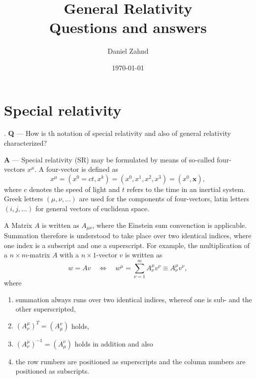 \documentclass[a4paper,11pt]{article}
\title{General Relativity\\ \vspace{0.2cm}\normalsize Questions and answers}
\author{Daniel Zahnd}
\date{\today}
\newcounter{question}
\numberwithin{equation}{section}
\newcommand\vect[1]{\ensuremath{\bm{#1}}}
\begin{document}
\newcommand\Que[1]{%
   \leavevmode\par
   \stepcounter{question}
   \noindent
   \thequestion. \textbf{Q} --- #1\par}

\newcommand\Ans[2][]{%
    \leavevmode\par\noindent
   {\leftskip0pt
    \textbf{A} --- \textbf{#1}#2\par}}

\maketitle
\thispagestyle{empty}
\tableofcontents

\newpage

\setcounter{page}{1}

\section{Special relativity}
\Que{How is th notation of special relativity and also of general relativity characterized?}
\Ans{
Special relativity (SR) may be formulated by means of so-called four-vectors $x^\mu$.
A four-vector is defined as \begin{equation}\label{defvierervektor}
x^\mu = (x^0 = ct,x^k) = (x^0,x^1,x^2,x^3) = (x^0, \vect{x}),
\end{equation} where $c$ denotes the speed of light and $t$ refers to the time in an inertial system. Greek letters $(\mu, \nu, \dots)$ are used for the components of four-vectors, latin letters $(i,j,\dots)$ for general vectors of euclidean space.

A Matrix $A$ is written as $A_{\mu\nu}$, where the Einstein sum convenction is applicable. Summation therefore is understood to take place over two identical indices, where one index is a subscript and one a superscript. For example, the multiplication of a $n\times m$-matrix $A$ with a $n\times 1$-vector $v$ is written as \begin{equation}
w = Av \quad \Leftrightarrow \quad w^\mu =\sum_{\nu = 1}^{m}A^\mu_{\nu} v^\nu \equiv A^\mu_{\nu} v^\nu,
\end{equation} where \begin{enumerate}
\item summation always runs over two identical indices, whereof one is sub- and the other superscripted,
\item $(A^\mu_{\nu})^T = (A^\nu_{\mu})$ holds,
\item $(A^\mu_{\nu})^{-1} = (A_\mu^{\nu})$ holds in addition and also
\item the row rumbers are positioned as superscripts and the column numbers are positioned as subscripts.
\end{enumerate}
}
\end{document}
